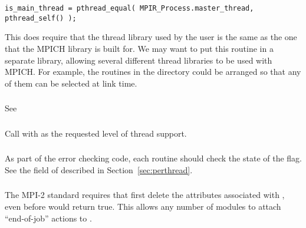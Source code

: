\documentclass{article}
\begin{document}
\begin{verbatim}
is_main_thread = pthread_equal( MPIR_Process.master_thread, pthread_self() );
\end{verbatim}
This does require that the thread library used by the user is the same as the
one that the MPICH library is built for.  We may want to put this routine in a
separate library, allowing several different thread libraries to be used with
MPICH.  For example, the routines in the  directory could be
arranged so that any of them can be selected at link time.

\subsubsection{}
See 

\subsubsection{}
Call  with  as the
requested level of thread support.

\subsubsection{}
As part of the error checking code, each routine should check the
state of the  flag.  
See the  field of 
described in Section~\ref{sec:perthread}. 

\subsubsection{}
\label{sec:finalize}
The MPI-2 standard requires that  first delete the
attributes associated with , even before
 would return true.  This allows any number of
modules to attach ``end-of-job'' actions to .
\end{document}
